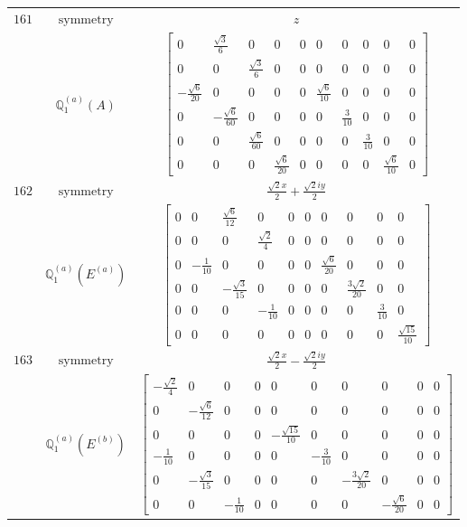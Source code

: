 \documentclass[fleqn,8pt,landscape]{jsarticle}
\begin{document}
\begin{longtable}{ccc}
$ 161 $ & $ \text{symmetry} $ & $ z $ \\
$  $ & $ \mathbb{Q}_{1}^{(a)}(A) $ & $ \begin{bmatrix} 0 & \frac{\sqrt{3}}{6} & 0 & 0 & 0 & 0 & 0 & 0 & 0 & 0 \\ 0 & 0 & \frac{\sqrt{3}}{6} & 0 & 0 & 0 & 0 & 0 & 0 & 0 \\ - \frac{\sqrt{6}}{20} & 0 & 0 & 0 & 0 & \frac{\sqrt{6}}{10} & 0 & 0 & 0 & 0 \\ 0 & - \frac{\sqrt{6}}{60} & 0 & 0 & 0 & 0 & \frac{3}{10} & 0 & 0 & 0 \\ 0 & 0 & \frac{\sqrt{6}}{60} & 0 & 0 & 0 & 0 & \frac{3}{10} & 0 & 0 \\ 0 & 0 & 0 & \frac{\sqrt{6}}{20} & 0 & 0 & 0 & 0 & \frac{\sqrt{6}}{10} & 0 \end{bmatrix} $ \\ \hline
$ 162 $ & $ \text{symmetry} $ & $ \frac{\sqrt{2} x}{2} + \frac{\sqrt{2} i y}{2} $ \\
$  $ & $ \mathbb{Q}_{1}^{(a)}(E^{(a)}) $ & $ \begin{bmatrix} 0 & 0 & \frac{\sqrt{6}}{12} & 0 & 0 & 0 & 0 & 0 & 0 & 0 \\ 0 & 0 & 0 & \frac{\sqrt{2}}{4} & 0 & 0 & 0 & 0 & 0 & 0 \\ 0 & - \frac{1}{10} & 0 & 0 & 0 & 0 & \frac{\sqrt{6}}{20} & 0 & 0 & 0 \\ 0 & 0 & - \frac{\sqrt{3}}{15} & 0 & 0 & 0 & 0 & \frac{3 \sqrt{2}}{20} & 0 & 0 \\ 0 & 0 & 0 & - \frac{1}{10} & 0 & 0 & 0 & 0 & \frac{3}{10} & 0 \\ 0 & 0 & 0 & 0 & 0 & 0 & 0 & 0 & 0 & \frac{\sqrt{15}}{10} \end{bmatrix} $ \\ \hline
$ 163 $ & $ \text{symmetry} $ & $ \frac{\sqrt{2} x}{2} - \frac{\sqrt{2} i y}{2} $ \\
$  $ & $ \mathbb{Q}_{1}^{(a)}(E^{(b)}) $ & $ \begin{bmatrix} - \frac{\sqrt{2}}{4} & 0 & 0 & 0 & 0 & 0 & 0 & 0 & 0 & 0 \\ 0 & - \frac{\sqrt{6}}{12} & 0 & 0 & 0 & 0 & 0 & 0 & 0 & 0 \\ 0 & 0 & 0 & 0 & - \frac{\sqrt{15}}{10} & 0 & 0 & 0 & 0 & 0 \\ - \frac{1}{10} & 0 & 0 & 0 & 0 & - \frac{3}{10} & 0 & 0 & 0 & 0 \\ 0 & - \frac{\sqrt{3}}{15} & 0 & 0 & 0 & 0 & - \frac{3 \sqrt{2}}{20} & 0 & 0 & 0 \\ 0 & 0 & - \frac{1}{10} & 0 & 0 & 0 & 0 & - \frac{\sqrt{6}}{20} & 0 & 0 \end{bmatrix} $ \\ \hline

\end{longtable}
\end{document}
